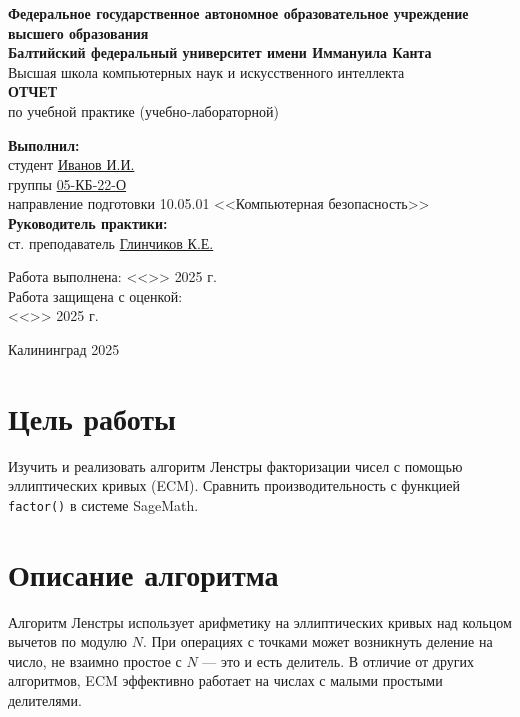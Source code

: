 \documentclass[12pt,a4paper]{article}
\begin{document}
\begin{titlepage}
    \centering
    {\large\textbf{Федеральное государственное автономное образовательное учреждение высшего образования}}\\[0.5cm]
    {\large\textbf{Балтийский федеральный университет имени Иммануила Канта}}\\[0.5cm]
    {\large Высшая школа компьютерных наук и искусственного интеллекта}\\[3cm]
    {\Large\textbf{ОТЧЕТ}}\\[1cm]
    {\Large по учебной практике (учебно-лабораторной)}\\[2cm]
    \begin{flushright}
        \large
        \textbf{Выполнил:}\\
        студент \underline{Иванов И.И.}\\[0.5cm]
        группы \underline{05-КБ-22-О}\\[0.5cm]
        направление подготовки 10.05.01 <<Компьютерная безопасность>>\\[2cm]
        \textbf{Руководитель практики:}\\
        ст. преподаватель \underline{Глинчиков К.Е.}\\[2cm]
    \end{flushright}
    \begin{flushright}
        Работа выполнена: <<\underline{\hspace{1cm}}>> \underline{\hspace{3cm}} 2025 г.\\[1cm]
        Работа защищена с оценкой: \underline{\hspace{6cm}}\\[1cm]
        <<\underline{\hspace{1cm}}>> \underline{\hspace{3cm}} 2025 г.\\
    \end{flushright}
    \vfill
    {\large Калининград 2025}
\end{titlepage}

\newpage

\section*{Цель работы}
Изучить и реализовать алгоритм Ленстры факторизации чисел с помощью эллиптических кривых (ECM). Сравнить производительность с функцией \texttt{factor()} в системе SageMath.

\section*{Описание алгоритма}
Алгоритм Ленстры использует арифметику на эллиптических кривых над кольцом вычетов по модулю $N$. При операциях с точками может возникнуть деление на число, не взаимно простое с $N$ — это и есть делитель. В отличие от других алгоритмов, ECM эффективно работает на числах с малыми простыми делителями.
\end{document}
